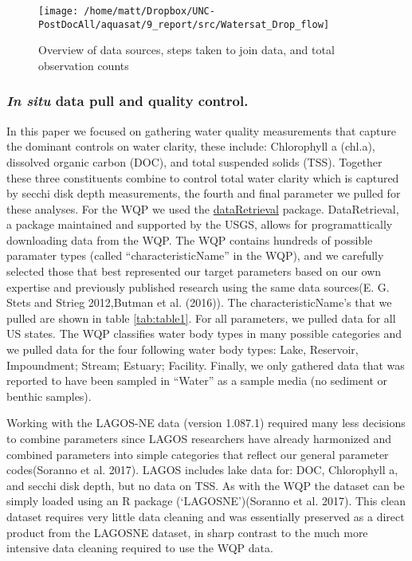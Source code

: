 \documentclass[]{article}
\begin{document}
\begin{figure}
\texttt{[image: /home/matt/Dropbox/UNC-PostDocAll/aquasat/9\_report/src/Watersat\_Drop\_flow]} \caption{Overview of data sources, steps taken to join data, and total observation counts}\label{fig:fig1}
\end{figure}

\subsubsection{\texorpdfstring{\emph{In situ} data pull and quality
control.}{In situ data pull and quality control.}}\label{in-situ-data-pull-and-quality-control.}

In this paper we focused on gathering water quality measurements that
capture the dominant controls on water clarity, these include:
Chlorophyll a (chl.a), dissolved organic carbon (DOC), and total
suspended solids (TSS). Together these three constituents combine to
control total water clarity which is captured by secchi disk depth
measurements, the fourth and final parameter we pulled for these
analyses. For the WQP we used the
\href{https://github.com/USGS-R/dataRetrieval}{dataRetrieval} package.
DataRetrieval, a package maintained and supported by the USGS, allows
for programattically downloading data from the WQP. The WQP contains
hundreds of possible paramater types (called ``characteristicName'' in
the WQP), and we carefully selected those that best represented our
target parameters based on our own expertise and previously published
research using the same data sources(E. G. Stets and Strieg 2012,Butman
et al. (2016)). The characteristicName's that we pulled are shown in
table \ref{tab:table1}. For all parameters, we pulled data for all US
states. The WQP classifies water body types in many possible categories
and we pulled data for the four following water body types: Lake,
Reservoir, Impoundment; Stream; Estuary; Facility. Finally, we only
gathered data that was reported to have been sampled in ``Water'' as a
sample media (no sediment or benthic samples).

Working with the LAGOS-NE data (version 1.087.1) required many less
decisions to combine parameters since LAGOS researchers have already
harmonized and combined parameters into simple categories that reflect
our general parameter codes(Soranno et al. 2017). LAGOS includes lake
data for: DOC, Chlorophyll a, and secchi disk depth, but no data on TSS.
As with the WQP the dataset can be simply loaded using an R package
(`LAGOSNE')(Soranno et al. 2017). This clean dataset requires very
little data cleaning and was essentially preserved as a direct product
from the LAGOSNE dataset, in sharp contrast to the much more intensive
data cleaning required to use the WQP data.
\end{document}
